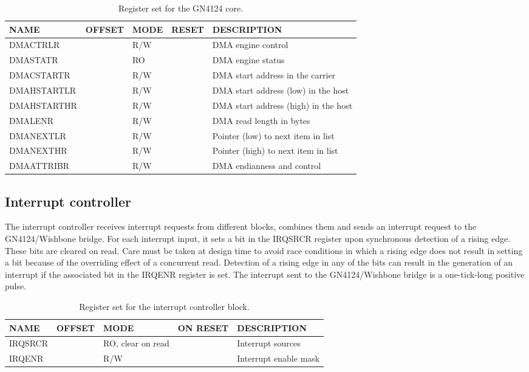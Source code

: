 \documentclass{article}
\begin{document}
\begin{table}[htbp]
  \centering
  \begin{tabularx}{\textwidth}{|l|r|l|l|X|}
    \hline
    \textbf{NAME} & \textbf{OFFSET} & \textbf{MODE} & \textbf{RESET} & \textbf{DESCRIPTION} \\
    \hline
    \hline
    DMACTRLR & & R/W & & DMA engine control\\
    \hline
    DMASTATR & & RO & & DMA engine status\\
    \hline
    DMACSTARTR & & R/W & & DMA start address in the carrier\\
    \hline
    DMAHSTARTLR & & R/W & & DMA start address (low) in the host\\
    \hline
    DMAHSTARTHR & & R/W & & DMA start address (high) in the host\\
    \hline
    DMALENR & & R/W & & DMA read length in bytes\\
    \hline
    DMANEXTLR & & R/W & & Pointer (low) to next item in list\\
    \hline
    DMANEXTHR & & R/W & & Pointer (high) to next item in list\\
    \hline
    DMAATTRIBR & & R/W & & DMA endianness and control\\
    \hline
  \end{tabularx}
  \caption{Register set for the GN4124 core.}
  \label{tab:gn4124_core}
\end{table}

\subsection{Interrupt controller}
The interrupt controller receives interrupt requests from different blocks, combines them and sends an interrupt request to the GN4124/Wishbone bridge. For each interrupt input, it sets a bit in the IRQSRCR register upon synchronous detection of a rising edge. These bits are cleared on read. Care must be taken at design time to avoid race conditions in which a rising edge does not result in setting a bit because of the overriding effect of a concurrent read. Detection of a rising edge in any of the bits can result in the generation of an interrupt if the associated bit in the IRQENR register is set. The interrupt sent to the GN4124/Wishbone bridge is a one-tick-long positive pulse.

\begin{table}[htbp]
  \centering
  \begin{tabularx}{\textwidth}{|l|r|X|l|l|}
    \hline
    \textbf{NAME} & \textbf{OFFSET} & \textbf{MODE} & \textbf{ON RESET} & \textbf{DESCRIPTION} \\
    \hline
    \hline
    IRQSRCR & & RO, clear on read & & Interrupt sources\\
    \hline
    IRQENR & & R/W & & Interrupt enable mask\\
    \hline
  \end{tabularx}
  \caption{Register set for the interrupt controller block.}
  \label{tab:irq_control}
\end{table}
\end{document}
